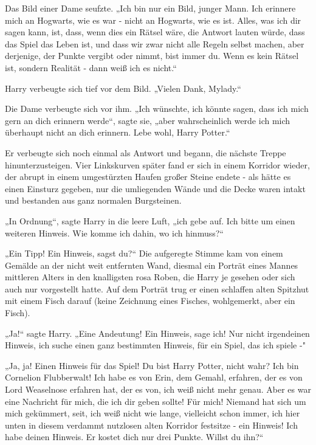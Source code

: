 {Das Bild einer Dame seufzte. „Ich bin nur ein Bild, junger Mann. Ich erinnere mich an Hogwarts, wie es war - nicht an Hogwarts, wie es ist. Alles, was ich dir sagen kann, ist, dass, wenn dies ein Rätsel wäre, die Antwort lauten würde, dass das Spiel das Leben ist, und dass wir zwar nicht alle Regeln selbst machen, aber derjenige, der Punkte vergibt oder nimmt, bist immer du. Wenn es kein Rätsel ist, sondern Realität - dann weiß ich es nicht.“

Harry verbeugte sich tief vor dem Bild. „Vielen Dank, Mylady.“

Die Dame verbeugte sich vor ihm. „Ich wünschte, ich könnte sagen, dass ich mich gern an dich erinnern werde“, sagte sie, „aber wahrscheinlich werde ich mich überhaupt nicht an dich erinnern. Lebe wohl, Harry Potter.“

Er verbeugte sich noch einmal als Antwort und begann, die nächste Treppe hinunterzusteigen. Vier Linkskurven später fand er sich in einem Korridor wieder, der abrupt in einem umgestürzten Haufen großer Steine endete - als hätte es einen Einsturz gegeben, nur die umliegenden Wände und die Decke waren intakt und bestanden aus ganz normalen Burgsteinen.

„In Ordnung“, sagte Harry in die leere Luft, „ich gebe auf. Ich bitte um einen weiteren Hinweis. Wie komme ich dahin, wo ich hinmuss?“

„Ein Tipp! Ein Hinweis, sagst du?“ Die aufgeregte Stimme kam von einem Gemälde an der nicht weit entfernten Wand, diesmal ein Porträt eines Mannes mittleren Alters in den knalligsten rosa Roben, die Harry je gesehen oder sich auch nur vorgestellt hatte. Auf dem Porträt trug er einen schlaffen alten Spitzhut mit einem Fisch darauf (keine Zeichnung eines Fisches, wohlgemerkt, aber ein Fisch).

„Ja!“ sagte Harry. „Eine Andeutung! Ein Hinweis, sage ich! Nur nicht irgendeinen Hinweis, ich suche einen ganz bestimmten Hinweis, für ein Spiel, das ich spiele -"

„Ja, ja! Einen Hinweis für das Spiel! Du bist Harry Potter, nicht wahr? Ich bin Cornelion Flubberwalt! Ich habe es von Erin, dem Gemahl, erfahren, der es von Lord Weaselnose erfahren hat, der es von, ich weiß nicht mehr genau. Aber es war eine Nachricht für mich, die ich dir geben sollte! Für mich! Niemand hat sich um mich gekümmert, seit, ich weiß nicht wie lange, vielleicht schon immer, ich hier unten in diesem verdammt nutzlosen alten Korridor festsitze - ein Hinweis! Ich habe deinen Hinweis. Er kostet dich nur drei Punkte. Willst du ihn?“

}
